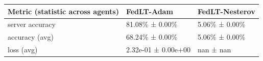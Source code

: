 \begin{tabular}{lll}
\hline
 Metric (statistic across agents)   & FedLT-Adam          & FedLT-Nesterov   \\
\hline
 server accuracy                    & 81.08\% ± 0.00\%      & 5.06\% ± 0.00\%    \\
 accuracy (avg)                     & 68.24\% ± 0.00\%      & 5.06\% ± 0.00\%    \\
 loss (avg)                         & 2.32e-01 ± 0.00e+00 & nan ± nan        \\
\hline
\end{tabular}
